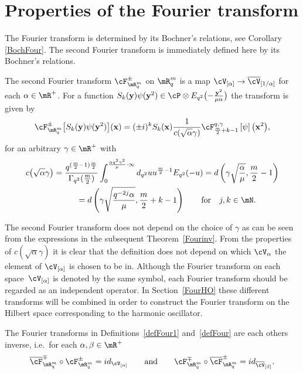\section{Properties of the Fourier transform}
\label{behave}



The Fourier transform is determined by its Bochner's relations, see Corollary \ref{BochFour}. The second Fourier transform is immediately def\/ined here by its Bochner's relations.
\begin{definition}
\label{defFour}
The second Fourier transform $\cF^{\pm}_{\mR^m_q}$ on $\mR^m_q$ is a map $\cV_{[\alpha]}\to\overline{\cV}_{[1/\alpha]}$ for each $\alpha\in\mR^+$. For a function $S_k(\bold{y})\psi(\bold{y}^2)\in\cP\otimes E_{q^2}\big({-}\frac{\bold{y}^2}{\mu\alpha}\big)$ the transform is given by
\begin{gather*}
\cF^{\pm}_{\mR^m_q}\big[S_k(\bold{y})\psi(\bold{y}^2)\big](\bold{x}) = (\pm i)^kS_k(\bold{x})\frac{1}{c(\sqrt{\alpha}\gamma)}\cF^{q,\gamma}_{\frac{m}{2}+k-1}\left[\psi\right]\big(\bold{x}^2\big),
\end{gather*}
for an arbitrary $\gamma\in\mR^+$ with
\begin{gather*}
c\big(\sqrt{\alpha}\gamma\big) = \frac{q^{(\frac{m}{2}-1)\frac{m}{2}}}{\Gamma_{q^2}(\frac{m}{2})}\int_0^{\frac{\alpha q^2\gamma^2 }{\mu}\cdot\infty}d_{q^2}u u^{\frac{m}{2}-1}E_{q^2}(-u)=d\left(\gamma\sqrt{\frac{\alpha}{\mu}},\frac{m}{2}-1\right)\\
 \phantom{c\big(\sqrt{\alpha}\gamma\big)}{}
 = d\left(\gamma\sqrt{\frac{q^{-2j}\alpha}{\mu}},\frac{m}{2}+k-1\right)\qquad\mbox{for} \quad j,k\in\mN.
\end{gather*}
\end{definition}
The second Fourier transform does not depend on the choice of $\gamma$ as can be seen from the expressions in the subsequent Theorem~\ref{Fourinv}. From the properties of $c(\sqrt{\alpha}\gamma)$ it is clear that the def\/inition does not depend on which $\cV_\alpha$ the element of $\cV_{[\alpha]}$ is chosen to be in. Although the Fourier transform on each space~$\cV_{[\alpha]}$ is denoted by the same symbol, each Fourier transform should be regarded as an independent operator. In Section~\ref{FourHO} these dif\/ferent transforms will be combined in order to construct the Fourier transform on the Hilbert space corresponding to the harmonic oscillator.


\begin{theorem}
\label{Fourinv}
The Fourier transforms in Definitions~{\rm \ref{defFour1}} and~{\rm \ref{defFour}} are each others inverse, i.e.\ for each $\alpha,\beta\in\mR^+$
\begin{gather*}
\overline{\cF}_{\mR^m_q}^{\mp}\circ\cF^{\pm}_{\mR^m_q} = id_{\cV_{[\alpha]}}\qquad\mbox{and}\qquad
\cF_{\mR^m_q}^{\mp}\circ\overline{\cF}^{\pm}_{\mR^m_q} = id_{\overline{\cV}_{[\beta]}}.
\end{gather*}
\end{theorem}


